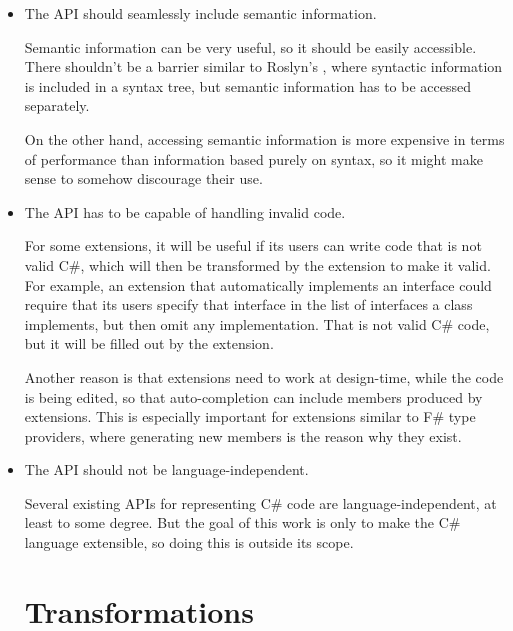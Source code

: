 \begin{itemize}
\item The \ac{API} should seamlessly include semantic information.

Semantic information can be very useful, so it should be easily accessible. There shouldn't be a barrier similar to Roslyn's , where syntactic information is included in a syntax tree, but semantic information has to be accessed separately.

On the other hand, accessing semantic information is more expensive in terms of performance than information based purely on syntax, so it might make sense to somehow discourage their use.

\item The \ac{API} has to be capable of handling invalid code.

For some extensions, it will be useful if its users can write code that is not valid C\#, which will then be transformed by the extension to make it valid. For example, an extension that automatically implements an interface could require that its users specify that interface in the list of interfaces a class implements, but then omit any implementation. That is not valid C\# code, but it will be filled out by the extension.

Another reason is that extensions need to work at design-time, while the code is being edited, so that auto-completion can include members produced by extensions. This is especially important for extensions similar to F\# type providers, where generating new members is the reason why they exist.

\item The \ac{API} should not be language-independent.

\nopagebreak

Several existing \acp{API} for representing C\# code are language-independent, at least to some degree. But the goal of this work is only to make the C\# language extensible, so doing this is outside its scope.

\section{Transformations}



\end{itemize}